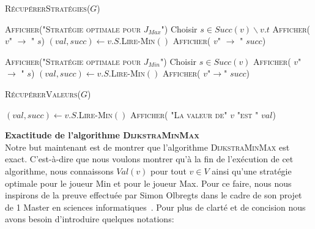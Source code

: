 \begin{algorithm}
	\caption{\textsc{RécupérerStratégies}($G$)}
	\label{algo:recupStrat}
	\begin{algorithmic}[1]
	
	\STATE \textsc{Afficher("Stratégie optimale pour $J_{Max}$")}
			\STATE Choisir $s \in Succ(v) \backslash v.t$
			\STATE \textsc{Afficher( $v$" $\rightarrow $ " $s$)}
		\ELSE
			\STATE $(val,succ) \leftarrow v.S.$\textsc{Lire-Min}$()$
			\STATE \textsc{Afficher( $v$" $\rightarrow$ " $succ$)}
		\ENDIF
	\ENDFOR
	
	\STATE \textsc{Afficher("Stratégie optimale pour $J_{Min}$")}
			\STATE Choisir $s \in Succ(v)$
			\STATE \textsc{Afficher( $v$" $ \rightarrow$ " $s$)}
		\ELSE	
			\STATE $(val,succ) \leftarrow v.S.$\textsc{Lire-Min}$()$
			\STATE \textsc{Afficher( $v $"$ \rightarrow $" $succ$)}
		\ENDIF
	\ENDFOR
	
	\end{algorithmic}
\end{algorithm}

\begin{algorithm}
	\caption{\textsc{RécupérerValeurs}($G$)}
	\label{algo:recupVal}
	\begin{algorithmic}[1]
	
	\FORALL{$v \in V$} 
		\STATE $(val,succ) \leftarrow v.S.$\textsc{Lire-Min}$()$
		\STATE \textsc{Afficher( "La valeur de" $v$ "est " $val$)}
	\ENDFOR
	
	
	\end{algorithmic}
\end{algorithm}


\FloatBarrier
	



\noindent\textbf{Exactitude de l'algorithme \textsc{DijkstraMinMax}}\\

Notre but maintenant est de montrer que l'algorithme \textsc{DijkstraMinMax} est exact. C'est-à-dire que nous voulons montrer qu'à la fin de l'exécution de cet algorithme, nous connaissons $Val(v)$ pour tout $v\in V$ ainsi qu'une stratégie optimale pour le joueur Min et pour le joueur Max.
Pour ce faire, nous nous inspirons de la preuve effectuée par Simon Olbregts dans le cadre de son projet de 1 Master en sciences informatiques~\cite{simon}. 
Pour plus de clarté et de concision nous avons besoin d'introduire quelques notations:\\

